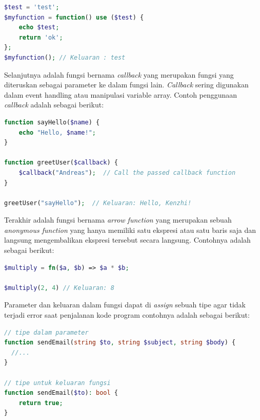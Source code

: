 \documentclass[a4paper,twoside]{article}
\begin{document}
\begin{enumerate}
\begin{itemize}
		            \begin{lstlisting}[language={php}, caption={Contoh penggunaan use}, label={kode:5:fungsi_exuse}]
$test = 'test';
$myfunction = function() use ($test) {
	echo $test;
	return 'ok';
};
$myfunction(); // Keluaran : test
					\end{lstlisting}

		            Selanjutnya adalah fungsi bernama \textit{callback} yang merupakan fungsi yang diteruskan sebagai parameter ke dalam fungsi lain. \textit{Callback} sering digunakan dalam {event handling} atau manipulasi variable array. Contoh penggunaan \textit{callback} adalah sebagai berikut:

		            \begin{lstlisting}[language={php}, caption={Contoh penggunaan callback}, label={kode:5:fungsi_excallback}]
function sayHello($name) {
	echo "Hello, $name!";
}

function greetUser($callback) {
	$callback("Andreas");  // Call the passed callback function
}

greetUser("sayHello");  // Keluaran: Hello, Kenzhi!
					\end{lstlisting}

		            Terakhir adalah fungsi bernama \textit{arrow function} yang merupakan sebuah \textit{anonymous function} yang hanya memiliki satu ekspresi atau satu baris saja dan langsung mengembalikan ekspresi tersebut secara langsung. Contohnya adalah sebagai berikut:

		            \begin{lstlisting}[language={php}, caption={Contoh penggunaan array function}, label={kode:5:fungsi_exarrow}]
$multiply = fn($a, $b) => $a * $b;

$multiply(2, 4) // Keluaran: 8
					\end{lstlisting}

		            Parameter dan keluaran dalam fungsi dapat di \textit{assign} sebuah tipe agar tidak terjadi error saat penjalanan kode program contohnya adalah sebagai berikut:

		            \begin{lstlisting}[language={php}, caption={Contoh penggunaan array function}, label={kode:5:fungsi_ex_type}]
// tipe dalam parameter
function sendEmail(string $to, string $subject, string $body) {
  //...
}

// tipe untuk keluaran fungsi
function sendEmail($to): bool {
    return true;
}
					\end{lstlisting}


\end{itemize}
\end{enumerate}
\end{document}
